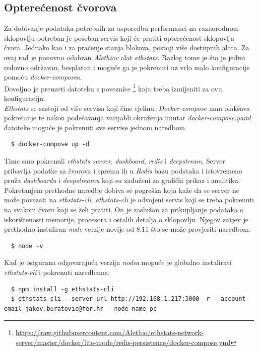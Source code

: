 \documentclass[times, utf8, zavrsni, numeric]{fer}
\begin{document}
\subsection{Opterećenost čvorova}
Za dobivanje podataka potrebnih za usporedbu performanci na raznorodnom sklopovlju potreban je poseban servis koji će pratiti
opterećenost sklopovlja čvora. Jednako kao i za praćenje stanja blokova, postoji više dostupnih alata. Za ovaj rad je ponovno
odabran \emph{Alethiov} alat \emph{ethstats}. Razlog tome je što je jedini redovno održavan, besplatan i moguće ga je pokrenuti
uz vrlo malo konfiguracije pomoću \emph{docker-composea}. \\
Dovoljno je preuzeti datoteku s poveznice
 \footnote{\url{https://raw.githubusercontent.com/Alethio/ethstats-network-server/master/docker/lite-mode/redis-persistence/docker-compose.yml}} koju 
 treba izmijeniti za ovu konfiguraciju. \\
\emph{Ethstats} se sastoji od više servisa koji čine cjelinu. \emph{Docker-compose} nam olakšava pokretanje te nakon podešavanja
varijabli okruženja unutar \emph{docker-compose.yaml} datoteke moguće je pokrenuti sve servise jednom naredbom.
\begin{lstlisting}
  $ docker-compose up -d
\end{lstlisting}
Time smo pokrenuli \emph{ethstats server}, \emph{dashboard}, \emph{redis} i \emph{deepstream}.
Server pribavlja podatke sa čvorova i sprema ih u \emph{Redis} bazu podataka i istovremeno pruža \emph{dashboardu} i \emph{deepstreamu} koji
su zaduženi za grafički prikaz i analitiku. \\
Pokretanjem prethodne naredbe dobiva se pogreška koja kaže da se server ne može povezati na \emph{ethstats-cli}. \emph{ethstats-cli} 
je odvojeni servis koji se treba pokrenuti na svakom čvoru koji se želi pratiti. On je zaslužan za prikupljanje podataka o iskorištenosti
memorije, procesora i ostalih detalja o sklopovlju. Njegov zatjev je prethodno instaliran \emph{node} verzije novije od 8.11 što se može 
provjeriti naredbom:
\begin{lstlisting}
  $ node -v
\end{lstlisting}
Kad je osigurana odgovarajuća verzija \emph{nodea} moguće je globalno instalirati \emph{ethstats-cli} i pokrenuti naredbama:
\begin{lstlisting}
  $ npm install -g ethstats-cli
  $ ethstats-cli --server-url http://192.168.1.217:3000 -r --account-email jakov.buratovic@fer.hr --node-name pc
\end{lstlisting}
\end{document}
